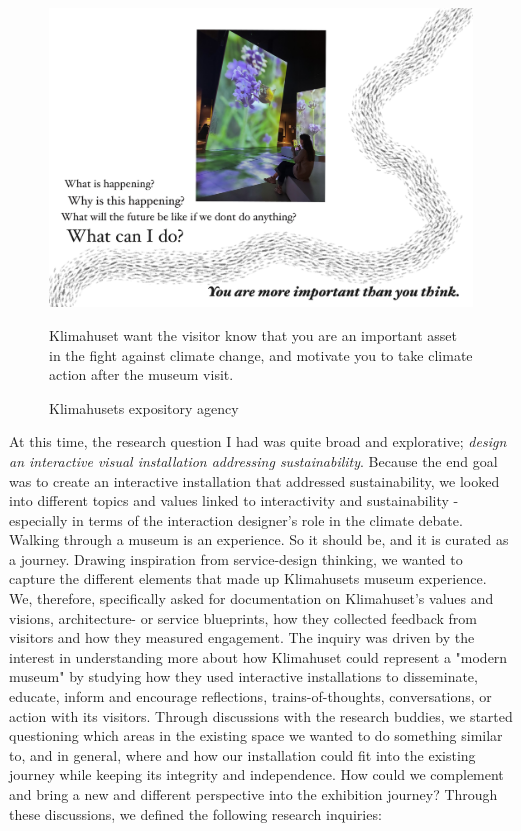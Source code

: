 \begin{figure}[H]
\includegraphics[width=12cm]{pictures/klimahuset/important.jpg}
\caption{Klimahusets expository agency}{Klimahuset want the visitor know that you are an important asset in the fight against climate change, and motivate you to take climate action after the museum visit.}
\centering 
\end{figure}

At this time, the research question I had was quite broad and explorative; \emph{design an interactive visual installation addressing sustainability}. Because the end goal was to create an interactive installation that addressed sustainability, we looked into different topics and values linked to interactivity and sustainability - especially in terms of the interaction designer's role in the climate debate. Walking through a museum is an experience. So it should be, and it is curated as a journey. Drawing inspiration from service-design thinking, we wanted to capture the different elements that made up Klimahusets museum experience. We, therefore, specifically asked for documentation on Klimahuset's values and visions, architecture- or service blueprints, how they collected feedback from visitors and how they measured engagement. The inquiry was driven by the interest in understanding more about how Klimahuset could represent a "modern museum" by studying how they used interactive installations to disseminate, educate, inform and encourage reflections, trains-of-thoughts, conversations, or action with its visitors. Through discussions with the research buddies, we started questioning which areas in the existing space we wanted to do something similar to, and in general, where and how our installation could fit into the existing journey while keeping its integrity and independence. How could we complement and bring a new and different perspective into the exhibition journey? Through these discussions, we defined the following research inquiries:

